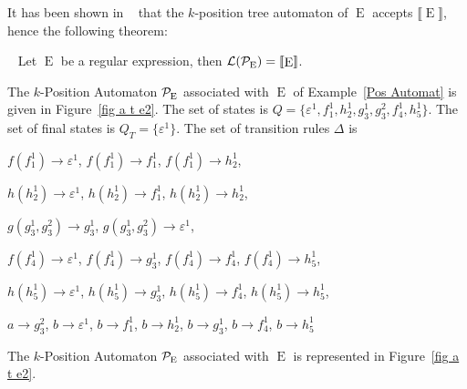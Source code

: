 \documentclass{llncs}
\DeclareMathOperator{\E}{E}
\begin{document}
  It has been shown in ~\cite{arxiv} that the $k$-position tree automaton of $\E$ accepts $\llbracket \E\rrbracket$, hence the following theorem:   

  
    \begin{theorem}\label{thm lang pe eq e}~\cite{arxiv}
     Let $\E$ be a regular expression, then ${\cal L}({\cal P}_{\E})=\llbracket \E\rrbracket$.
  \end{theorem}
    
\begin{example}
The $k$-Position Automaton ${\cal  P}_{\E}$ associated with $\E$ of Example~\ref{Pos Automat} is given in Figure~\ref{fig a t e2}.
The set of states is $Q=\{\varepsilon^1,f^1_1,h^1_2,g^1_3,g^2_3,f^1_4,h^1_5\}$. The set of final states is $Q_T=\{\varepsilon^1\}$. 
The set of transition rules $\Delta$ is 

\centerline{
    $f(f_1^1)\rightarrow \varepsilon^1$, $f(f_1^1)\rightarrow f_1^1$, $f(f_1^1)\rightarrow h_2^1$,
}

\centerline{
    $h(h_2^1)\rightarrow \varepsilon^1$, $h(h_2^1)\rightarrow f_1^1$, $h(h_2^1)\rightarrow h_2^1$,
}

\centerline{
    $g(g_3^1,g_3^2)\rightarrow g_3^1$, $g(g_3^1,g_3^2)\rightarrow \varepsilon^1$,
}

\centerline{
    $f(f_4^1)\rightarrow \varepsilon^1$, $f(f_4^1)\rightarrow g_3^1$, $f(f_4^1)\rightarrow f_4^1$, $f(f_4^1)\rightarrow h_5^1$,
}

\centerline{
    $h(h_5^1)\rightarrow \varepsilon^1$, $h(h_5^1)\rightarrow g_3^1$, $h(h_5^1)\rightarrow f_4^1$, $h(h_5^1)\rightarrow h_5^1$,
}

\centerline{
   $a\rightarrow g_3^2$, $b\rightarrow \varepsilon^1$, $b\rightarrow f_1^1$, $b\rightarrow h_2^1$, $b\rightarrow g_3^1$, $b\rightarrow f_4^1$, $b\rightarrow h_5^1$
}

The $k$-Position Automaton ${\cal P}_{\E}$ associated with $\E$ is represented in Figure~\ref{fig a t e2}.
\end{example}
\end{document}
